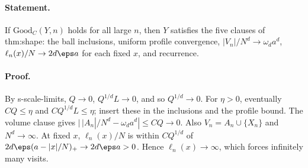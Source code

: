 \paragraph{Statement.} If $\mathrm{Good}_C(Y,n)$ holds for all large $n$, then $Y$ satisfies the five clauses of thm:shape: the ball inclusions, uniform profile
convergence, $|V_n|/N^d\to\omega_da^d$, $\ell_n(x)/N\to2d\eps a$ for each fixed $x$, and recurrence.
\paragraph{Proof.} By s-scale-limits, $Q\to0$, $Q^{1/d}L\to0$, and so $Q^{1/d}\to0$. For $\eta>0$, eventually $CQ\leq\eta$ and $CQ^{1/d}L\leq\eta$; insert these in the
inclusions and the profile bound. The volume clause gives $|\,|A_n|/N^d-\omega_da^d|\leq CQ\to0$. Also $V_n=A_n\cup\{X_n\}$ and $N^d\to\infty$. At fixed $x$,
$\ell_n(x)/N$ is within $CQ^{1/d}$ of $2d\eps(a-|x|/N)_+\to2d\eps a>0$. Hence $\ell_n(x)\to\infty$, which forces infinitely many visits.
